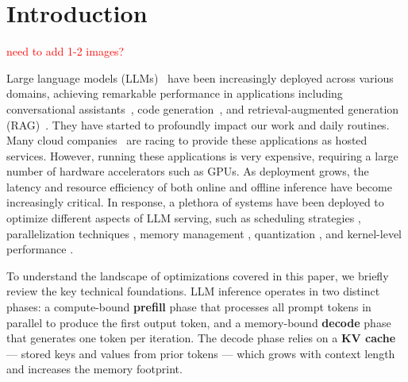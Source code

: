\section{Introduction}
\label{sec:intro}

\textcolor{red}{need to add 1-2 images?}

Large language models (LLMs)~\cite{wei2022emergentabilitieslargelanguage, openai2024gpt4technicalreport,deepseekai2025deepseekv3technicalreport,wei2022emergent} have been increasingly deployed across various domains, achieving remarkable performance in applications including conversational assistants~\cite{dam2024completesurveyllmbasedai,10.1145/3580305.3599572}, code generation~\cite{hui2024qwen25codertechnicalreport}, and retrieval-augmented generation (RAG)~\cite{NEURIPS2020_6b493230,yao2025cacheblendfastlargelanguage}. They have started to profoundly impact our work and daily routines. Many cloud companies~\cite{openai2024chatgpt,anthropic2024claude,google2024gemini} are racing to provide these applications as hosted services. However, running these applications is very expensive, requiring a large number of hardware accelerators such as GPUs. As deployment grows, the latency and resource efficiency of both online and offline inference have become increasingly critical. In response, a plethora of systems have been deployed to optimize different aspects of LLM serving, such as scheduling strategies \cite{pang2025optimizingllminferencethroughput,zhong2024distservedisaggregatingprefilldecoding,zheng2025bucketservebucketbaseddynamicbatching,agrawal2024tamingthroughputlatencytradeoffllm}, parallelization techniques \cite{su2025seesawhighthroughputllminference,wu2024loongserveefficientlyservinglongcontext}, memory management \cite{kwon2023efficientmemorymanagementlarge,prabhu2025vattentiondynamicmemorymanagement,zhang2025jengaeffectivememorymanagement}, quantization \cite{chee2024quip2bitquantizationlarge,lin2024awqactivationawareweightquantization}, and kernel-level performance \cite{yi2025patacceleratingllmdecoding,MLSYS2025_96894468}.

To understand the landscape of optimizations covered in this paper, we briefly review the key technical foundations. LLM inference operates in two distinct phases: a compute-bound \textbf{prefill} phase that processes all prompt tokens in parallel to produce the first output token, and a memory-bound \textbf{decode} phase that generates one token per iteration. The decode phase relies on a \textbf{KV cache} — stored keys and values from prior tokens — which grows with context length and increases the memory footprint.

